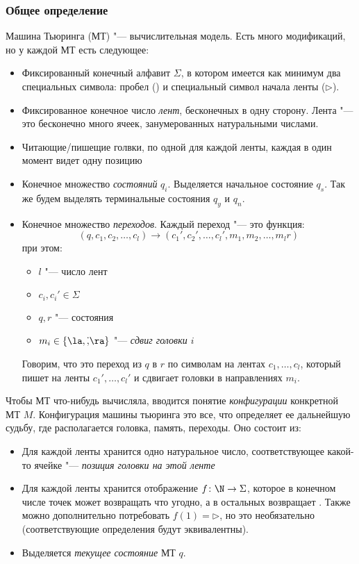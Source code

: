 \subsubsection{Общее определение}
Машина Тьюринга (МТ) "--- вычислительная модель.
Есть много модификаций, но у каждой МТ есть следующее:
\begin{itemize}
	\item
		Фиксированный конечный алфавит $\Sigma$, в котором имеется как минимум два специальных символа: пробел (\textvisiblespace) и
		специальный символ начала ленты ($\triangleright$).
	\item
		Фиксированное конечное число \textit{лент}, бесконечных в одну сторону.
		Лента "--- это бесконечно много ячеек, занумерованных натуральными числами.
	\item Читающие/пишещие голвки, по одной для каждой ленты, каждая в один момент видет одну позицию 
	\item Конечное множество \textit{состояний} $q_i$. Выделяется начальное состояние $q_s$.
		Так же будем выделять терминальные состояния $q_y$ и $q_n$.
	\item Конечное множество \textit{переходов}.
		Каждый переход "--- это функция:
		\[(q, c_1, c_2, \dots, c_l) \to (c_1', c_2', \dots, c_l', m_1, m_2, \dots, m_l r)\]
		при этом:
		\begin{itemize}
			\item $l$ "--- число лент
			\item $c_i, c_i' \in \Sigma$
			\item $q, r$ "--- состояния
			\item $m_i \in \{\la, \dot, \ra\}$ "--- \textit{сдвиг головки $i$}
		\end{itemize}
		Говорим, что это переход из $q$ в $r$ по символам на лентах $c_1, \dots, c_l$, который пишет на ленты $c_1', \dots, c_l'$
		и сдвигает головки в направлениях $m_i$.
\end{itemize}

\begin{center}
\end{center}

Чтобы МТ что-нибудь вычисляла, вводится понятие \textit{конфигурации} конкретной МТ $M$.
Конфигурация машины тьюринга это все, что определяет ее дальнейшую судьбу, где располагается головка, память, переходы. 
Оно состоит из:
\begin{itemize}
	\item Для каждой ленты хранится одно натуральное число, соответствующее какой-то ячейке "--- \textit{позиция головки на этой ленте}
	\item
		Для каждой ленты хранится отображение $f \colon \N \to \Sigma$, которое в конечном числе точек может возвращать что угодно, а в остальных возвращает \textvisiblespace.
		Также можно дополнительно потребовать $f(1)=\triangleright$, но это необязательно (соответствующие определения будут эквивалентны).
	\item
		Выделяется \textit{текущее состояние} МТ $q$.
\end{itemize}

